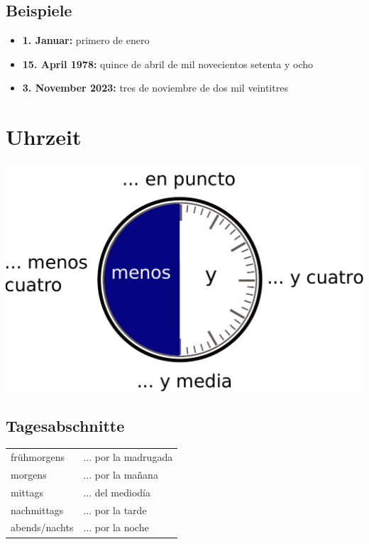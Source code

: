 \documentclass{spanish_summary}
\begin{document}
\subsection*{Beispiele}
\begin{itemize}
  \item \textbf{1. Januar: } primero de enero
  \item \textbf{15. April 1978: } quince de abril de mil novecientos setenta y ocho
  \item \textbf{3. November 2023: } tres de noviembre de dos mil veintitres
\end{itemize}

\newpage

\section*{Uhrzeit}

\begin{center}
  \includegraphics[scale=0.6]{uhrzeit.pdf}
\end{center}

\subsection*{Tagesabschnitte}
\begin{longtable}{p{} p{}} 
  frühmorgens & ... por la madrugada \\
  morgens & ... por la ma\~{n}ana \\
  mittags & ... del mediodía \\
  nachmittags & ... por la tarde \\
  abends/nachts & ... por la noche
\end{longtable}
\end{document}
